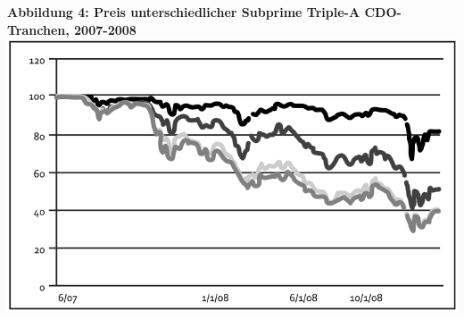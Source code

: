 \documentclass[a4paper,11pt]{report}
\begin{document}
\textbf{Abbildung 4: Preis unterschiedlicher Subprime Triple-A CDO-Tranchen, 2007-2008}
\newline
\includegraphics[width=\textwidth]{abb4}
\end{document}

